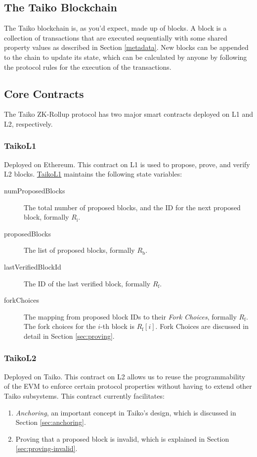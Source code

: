 \documentclass[9pt,oneside]{amsart}
\begin{document}
\begin{multicols}{2}
\section{The Taiko Blockchain}
The Taiko blockchain is, as you'd expect, made up of blocks. A block is a collection of transactions that are executed sequentially with some shared property values as described in Section \ref{metadata}. New blocks can be appended to the chain to update its state, which can be calculated by anyone by following the protocol rules for the execution of the transactions.

\subsection{Core Contracts}
The Taiko ZK-Rollup protocol has two major smart contracts deployed on L1 and L2, respectively.

\subsubsection{TaikoL1} Deployed on Ethereum. This contract on L1 is used to propose, prove, and verify L2 blocks. \underline{TaikoL1} maintains the following state variables:

\begin{description}
\item[numProposedBlocks] The total number of proposed blocks, and the ID for the next proposed block, formally $R_\mathrm{i}$.
\item[proposedBlocks] The list of proposed blocks, formally $R_\mathrm{b}$.
\item[lastVerifiedBlockId] The ID of the last verified block, formally $R_\mathrm{f}$.
\item[forkChoices] The mapping from proposed block IDs to their \emph{Fork Choices}, formally $R_\mathrm{f}$. The fork choices for the $i$-th block is $R_\mathrm{f}[i]$. Fork Choices are discussed in detail in Section \ref{sec:proving}.
\end{description}

\subsubsection{{TaikoL2}} Deployed on Taiko. This contract on L2 allows us to reuse the programmability of the EVM to enforce certain protocol properties without having to extend other Taiko subsystems. This contract currently facilitates:
\begin{enumerate}
\item \emph{Anchoring}, an important concept in Taiko's design, which is discussed in Section \ref{sec:anchoring}.
\item Proving that a proposed block is invalid, which is explained in Section \ref{sec:proving-invalid}.
\end{enumerate}


\end{multicols}
\end{document}

